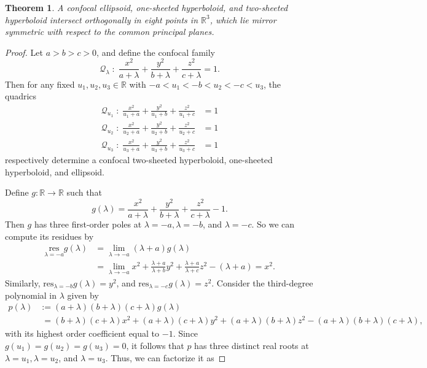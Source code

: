 \documentclass[10pt, a4paper]{article}
\theoremstyle{BoldTopSpacing}
\newtheorem{theorem}{Theorem}[section]
\theoremstyle{BoldTopSpacing}
\theoremstyle{BoldTopSpacing}
\theoremstyle{BoldTopBottomSpacing}
\theoremstyle{BoldTopSpacing}
\theoremstyle{BoldTopBottomSpacing}
\theoremstyle{remark}
\begin{document}
\begin{theorem}
\label{thm:confocal-quadrics-intersect-eight-points}
A confocal ellipsoid, one-sheeted hyperboloid, and two-sheeted hyperboloid intersect orthogonally in eight points in $\mathbb{R}^3$, which lie mirror symmetric with respect to the common principal planes.
\end{theorem}
\begin{proof}
Let $a > b > c > 0$, and define the confocal family
\[
    \mathcal{Q}_{\lambda} \; : \; \frac{x^2}{a + \lambda} + \frac{y^2}{b + \lambda} + \frac{z^2}{c + \lambda} = 1.
\]
Then for any fixed $u_{1}, u_{2}, u_{3} \in \mathbb{R}$ with $-a < u_{1} < -b < u_{2} < -c < u_{3}$, the quadrics
\begin{align*}
\mathcal{Q}_{u_{1}} \; : \; \frac{x^2}{u_{1} + a} + \frac{y^2}{u_{1} + b} + \frac{z^2}{u_{1} + c} &= 1 \\
\mathcal{Q}_{u_{2}}\; : \; \frac{x^2}{u_{2} + a} + \frac{y^2}{u_{2} + b} + \frac{z^2}{u_{2} + c} &= 1 \\
\mathcal{Q}_{u_{3}} \; : \; \frac{x^2}{u_{3} + a} + \frac{y^2}{u_{3} + b} + \frac{z^2}{u_{3} + c} &= 1
\end{align*}
respectively determine a confocal two-sheeted hyperboloid, one-sheeted hyperboloid, and ellipsoid. \par
Define $g : \mathbb{R} \to \mathbb{R}$ such that
\[
    g(\lambda) = \frac{x^2}{a + \lambda} + \frac{y^2}{b + \lambda} + \frac{z^2}{c + \lambda} - 1.
\]
Then $g$ has three first-order poles at $\lambda = -a, \lambda = -b$, and $\lambda = -c$. So we can compute its residues by
\begin{align*}
\underset{\lambda = -a}{\text{res}} g(\lambda) &= \lim_{\lambda \to -a} (\lambda + a) g(\lambda) \\
&= \lim_{\lambda \to -a} x^2 + \frac{\lambda + a}{\lambda + b}  y^2 + \frac{\lambda + a}{\lambda + c} z^2 - (\lambda + a) = x^2.
\end{align*}
Similarly, $\text{res}_{\lambda = -b} g(\lambda) = y^2$, and $\text{res}_{\lambda = -c} g(\lambda) = z^2$. Consider the third-degree polynomial in $\lambda$ given by
\begin{align*}
p(\lambda) &:= (a+\lambda)(b+\lambda)(c+\lambda)g(\lambda) \\
&\;= (b+\lambda)(c+\lambda)x^2 + (a+\lambda)(c+\lambda)y^2 + (a+\lambda)(b+\lambda)z^2  - (a+\lambda)(b+\lambda)(c+\lambda),
\end{align*}
with its highest order coefficient equal to $-1$. Since $g(u_{1}) = g(u_{2}) = g(u_{3}) = 0$, it follows that $p$ has three distinct real roots at $\lambda = u_{1}, \lambda = u_{2}$, and $\lambda = u_{3}$. Thus, we can factorize it as

\end{proof}
\end{document}
